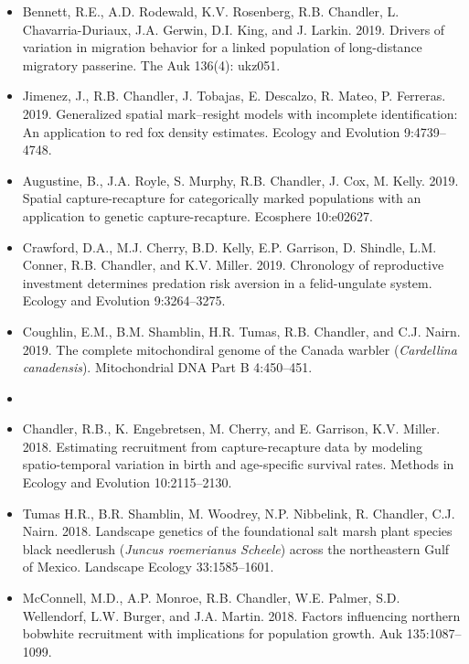 \documentclass[12pt]{article}
\begin{document}
\begin{itemize}
\item Bennett, R.E., A.D. Rodewald, K.V. Rosenberg, R.B. Chandler,
  L. Chavarria-Duriaux, J.A. Gerwin, D.I. King, and
  J. Larkin. 2019. Drivers of variation in migration behavior for a
  linked population of long-distance migratory passerine. The Auk
  136(4): ukz051.
  
\item Jimenez, J., R.B. Chandler, J. Tobajas, E. Descalzo, R. Mateo,
  P. Ferreras. 2019. Generalized spatial mark–resight models with
  incomplete identification: An application to red fox density
  estimates. Ecology and Evolution 9:4739--4748. 
  
\item Augustine, B., J.A. Royle, S. Murphy, R.B. Chandler,
  J. Cox, M. Kelly. 2019. Spatial capture-recapture for
  categorically marked populations with an application to genetic
  capture-recapture. Ecosphere 10:e02627.

\item Crawford, D.A., M.J. Cherry, B.D. Kelly, E.P. Garrison,
  D. Shindle, L.M. Conner, R.B. Chandler, and
  K.V. Miller. 2019. Chronology of reproductive investment determines
  predation risk aversion in a felid-ungulate system. Ecology and
  Evolution 9:3264--3275. 

\item Coughlin, E.M., B.M. Shamblin, H.R. Tumas, R.B. Chandler, and
  C.J. Nairn. 2019. The complete mitochondiral genome of the
  Canada warbler ({\it Cardellina canadensis}). Mitochondrial DNA Part
  B 4:450--451.

  
\item[] { \\}

\item Chandler, R.B., K. Engebretsen, M. Cherry, and E. Garrison, 
  K.V. Miller. 2018. Estimating recruitment from
  capture-recapture data by modeling spatio-temporal variation in
  birth and age-specific survival rates. Methods in Ecology and
  Evolution 10:2115--2130.

\item Tumas H.R., B.R. Shamblin, M. Woodrey, N.P. Nibbelink,
  R. Chandler, C.J. Nairn. 2018. Landscape genetics of the
  foundational salt marsh plant species black needlerush ({\it Juncus
    roemerianus Scheele}) across the northeastern Gulf of
  Mexico. Landscape Ecology 33:1585--1601.
  
\item McConnell, M.D., A.P. Monroe, R.B. Chandler, W.E. Palmer,
  S.D. Wellendorf, L.W. Burger, and J.A. Martin. 2018. Factors
  influencing northern bobwhite recruitment with implications for
  population growth. Auk 135:1087--1099.
  

\end{itemize}
\end{document}
